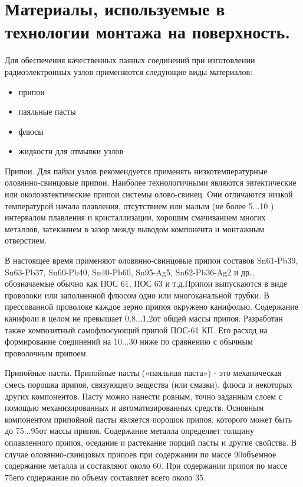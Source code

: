 \documentclass[unicode, 12pt, a4paper, oneside]{article}
\begin{document}
\section{Материалы, используемые в технологии монтажа на поверхность.}

Для обеспечения качественных  паяных соединений при изготовлении радиоэлектронных узлов применяются следующие виды материалов:

\begin{itemize}
\item припои
\item паяльные пасты
\item флюсы
\item жидкости для отмывки узлов
\end{itemize}

Припои. Для пайки узлов рекомендуется применять низкотемпературные оловянно-свинцовые припои. Наиболее технологичными являются эвтектические или околоэвтектические припои системы олово-свинец. Они отличаются низкой температурой начала плавления, отсутствием или малым (не более 5...10 \textdiscount) интервалом плавления и кристаллизации, хорошим смачиванием многих металлов, затеканием в зазор между выводом компонента и монтажным отверстием.

В настоящее время применяют оловянно-свинцовые припои составов Sn61-Pb39, Sn63-Pb37, Sn60-Pb40, Sn40-Pb60, Sn95-Ag5, Sn62-Pb36-Ag2 и др., обозначаемые обычно как ПОС 61, ПОС 63 и т.д.Припои выпускаются в виде проволоки или заполненной флюсом одно или многоканальной трубки. В прессованной проволоке каждое зерно припоя окружено канифолью. Содержание канифоли в целом не превышает 0,8...1,2\textdiscount от общей массы припоя. Разработан также композитный самофлюсующий припой ПОС-61 КП. Его расход на формирование соединений на 10...30 \textdiscount ниже по сравнению с обычным проволочным припоем.

Припойные пасты. Припойные пасты («паяльная паста») - это механическая смесь порошка припоя, связующего вещества (или смазки), флюса и некоторых других компонентов. Пасту можно нанести ровным, точно заданным слоем с помощью механизированных и автоматизированных средств. Основным компонентом припойной пасты является порошок припоя, которого может быть до 75...95\textdiscount от массы припоя. Содержание металла определяет толщину оплавленного припоя, оседание и растекание порций пасты и другие свойства. В случае оловянно-свинцовых припоев при содержании по массе 90\textdiscount объемное содержание металла и  составляют около 60\textdiscount.  При содержании припоя по массе 75\textdiscount его содержание по объему составляет всего около 35\textdiscount.
\end{document}
